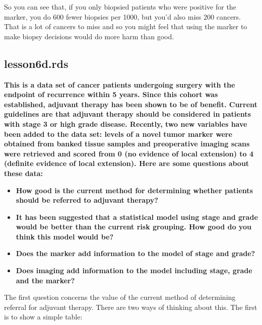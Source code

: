 \documentclass[]{book}
\newenvironment{Shaded}{\begin{snugshade}}{\end{snugshade}}
\newcommand{\DataTypeTok}[1]{\textcolor[rgb]{0.13,0.29,0.53}{#1}}
\newcommand{\KeywordTok}[1]{\textcolor[rgb]{0.13,0.29,0.53}{\textbf{#1}}}
\newcommand{\NormalTok}[1]{#1}
\newcommand{\OperatorTok}[1]{\textcolor[rgb]{0.81,0.36,0.00}{\textbf{#1}}}
\newcommand{\StringTok}[1]{\textcolor[rgb]{0.31,0.60,0.02}{#1}}
\providecommand{\tightlist}{%
  \setlength{\itemsep}{0pt}\setlength{\parskip}{0pt}}
\begin{document}
So you can see that, if you only biopsied patients who were positive for
the marker, you do 600 fewer biopsies per 1000, but you'd also miss 200
cancers. That is a lot of cancers to miss and so you might feel that
using the marker to make biopsy decisions would do more harm than good.

\hypertarget{lesson6d.rds}{%
\subsection{lesson6d.rds}\label{lesson6d.rds}}

\textbf{This is a data set of cancer patients undergoing surgery with
the endpoint of recurrence within 5 years. Since this cohort was
established, adjuvant therapy has been shown to be of benefit. Current
guidelines are that adjuvant therapy should be considered in patients
with stage 3 or high grade disease. Recently, two new variables have
been added to the data set: levels of a novel tumor marker were obtained
from banked tissue samples and preoperative imaging scans were retrieved
and scored from 0 (no evidence of local extension) to 4 (definite
evidence of local extension). Here are some questions about these data:}

\begin{itemize}
\tightlist
\item
  \textbf{How good is the current method for determining whether
  patients should be referred to adjuvant therapy?}
\item
  \textbf{It has been suggested that a statistical model using stage and
  grade would be better than the current risk grouping. How good do you
  think this model would be?}
\item
  \textbf{Does the marker add information to the model of stage and
  grade?}
\item
  \textbf{Does imaging add information to the model including stage,
  grade and the marker?}
\end{itemize}

The first question concerns the value of the current method of
determining referral for adjuvant therapy. There are two ways of
thinking about this. The first is to show a simple table:

\begin{Shaded}
\end{Shaded}
\end{document}
